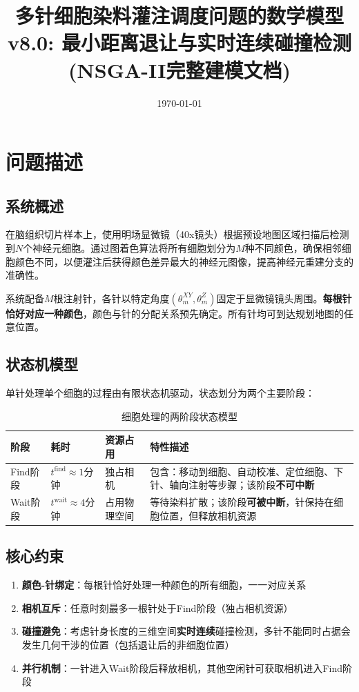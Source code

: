 \documentclass[11pt,a4paper]{article}
\title{\textbf{多针细胞染料灌注调度问题的数学模型} \\ \large v8.0: 最小距离退让与实时连续碰撞检测 \\ (NSGA-II完整建模文档)}
\author{}
\date{\today}
\begin{document}
\maketitle
\tableofcontents
\newpage

\section{问题描述}

\subsection{系统概述}

在脑组织切片样本上，使用明场显微镜（40x镜头）根据预设地图区域扫描后检测到$N$个神经元细胞。通过图着色算法将所有细胞划分为$M$种不同颜色，确保相邻细胞颜色不同，以便灌注后获得颜色差异最大的神经元图像，提高神经元重建分支的准确性。

系统配备$M$根注射针，各针以特定角度$(\theta_m^{XY}, \theta_m^{Z})$固定于显微镜镜头周围。\textbf{每根针恰好对应一种颜色}，颜色与针的分配关系预先确定。所有针均可到达规划地图的任意位置。

\subsection{状态机模型}

单针处理单个细胞的过程由有限状态机驱动，状态划分为两个主要阶段：

\begin{table}[H]
\centering
\begin{tabular}{|l|l|l|p{6cm}|}
\hline
\textbf{阶段} & \textbf{耗时} & \textbf{资源占用} & \textbf{特性描述} \\
\hline
Find阶段 & $t^{\text{find}} \approx 1$分钟 & 独占相机 & 包含：移动到细胞、自动校准、定位细胞、下针、轴向注射等步骤；该阶段\textbf{不可中断} \\
\hline
Wait阶段 & $t^{\text{wait}} \approx 4$分钟 & 占用物理空间 & 等待染料扩散；该阶段\textbf{可被中断}，针保持在细胞位置，但释放相机资源 \\
\hline
\end{tabular}
\caption{细胞处理的两阶段状态模型}
\end{table}

\subsection{核心约束}
\begin{enumerate}
    \item \textbf{颜色-针绑定}：每根针恰好处理一种颜色的所有细胞，一一对应关系
    \item \textbf{相机互斥}：任意时刻最多一根针处于Find阶段（独占相机资源）
    \item \textbf{碰撞避免}：考虑针身长度的三维空间\textbf{实时连续}碰撞检测，多针不能同时占据会发生几何干涉的位置（包括退让后的非细胞位置）
    \item \textbf{并行机制}：一针进入Wait阶段后释放相机，其他空闲针可获取相机进入Find阶段
\end{enumerate}
\end{document}
